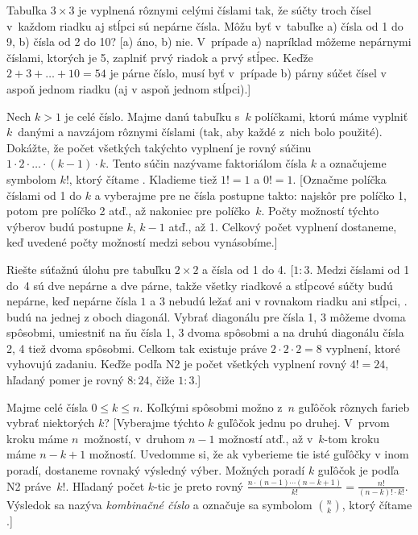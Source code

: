 {
Tabuľka $3\times3$ je vyplnená rôznymi celými číslami tak, že
súčty troch čísel v~každom riadku aj stĺpci sú nepárne čísla.
Môžu byť v~tabuľke a) čísla od 1 do 9, b) čísla od 2 do 10?
[a) áno, b) nie. V~prípade a) napríklad môžeme nepárnymi číslami,
ktorých je 5, zaplniť prvý riadok a prvý stĺpec. Keďže
$2+3+{\dots}+10=54$ je párne číslo, musí byť v~prípade b) párny súčet
čísel v aspoň jednom riadku (aj v aspoň jednom stĺpci).]

Nech $k>1$ je celé číslo.
Majme danú tabuľku s~$k$ políčkami, ktorú máme vyplniť $k$~danými
a navzájom rôznymi číslami (tak, aby každé z~nich bolo použité).
Dokážte, že počet všetkých takýchto vyplnení je rovný súčinu
$1\cdot2\cdot\dots\cdot(k-1)\cdot k$. Tento súčin nazývame faktoriálom
čísla $k$ a označujeme symbolom $k!$, ktorý čítame .
Kladieme tiež $1!=1$ a $0!=1$.
[Označme políčka číslami od 1 do $k$ a vyberajme pre ne čísla
postupne takto: najskôr pre políčko 1, potom pre políčko 2 atď., až
nakoniec pre políčko~$k$. Počty možností týchto výberov budú
postupne $k$, $k-1$ atď., až 1. Celkový počet vyplnení dostaneme,
keď uvedené počty možností medzi sebou vynásobíme.]

Riešte súťažnú úlohu pre tabuľku $2 \times 2$ a čísla od 1 do 4.
[$1:3$. Medzi číslami od 1 do~4 sú dve nepárne a dve párne, takže všetky
riadkové a stĺpcové súčty budú nepárne, keď nepárne čísla $1$ a $3$
nebudú ležať ani v rovnakom riadku ani stĺpci, \tj. budú na
jednej z oboch diagonál. Vybrať diagonálu pre čísla 1, 3 môžeme
dvoma spôsobmi, umiestniť na ňu čísla 1, 3 dvoma spôsobmi a na
druhú diagonálu čísla 2, 4 tiež dvoma spôsobmi.
Celkom tak existuje práve $2\cdot2\cdot2=8$ vyplnení,
ktoré vyhovujú zadaniu. Keďže podľa N2 je počet
všetkých vyplnení rovný $4!=24$, hľadaný pomer je rovný
$8:24$, čiže $1:3$.]

\D
Majme celé čísla $0 \leq k\leq n$. Koľkými spôsobmi možno z~$n$
guľôčok rôznych farieb vybrať niektorých $k$?
[Vyberajme týchto $k$ guľôčok jednu po druhej. V~prvom kroku máme
$n$~možností, v~druhom $n-1$ možností atď., až v~$k$-tom
kroku máme ${n-k+1}$ možností. Uvedomme si, že ak vyberieme
tie isté guľôčky v inom poradí, dostaneme rovnaký výsledný výber.
Možných poradí $k$ guľôčok je podľa N2 práve~$k!$.
Hľadaný počet $k$-tic je preto rovný
$\frac{n\cdot(n-1)\cdots(n-k+1)}{k!} =
\frac{n!}{(n-k)!\cdot k!}$. Výsledok sa nazýva {\it
kombinačné číslo} a označuje sa symbolom $\binom{n}{k}$, ktorý
čítame .]

}
